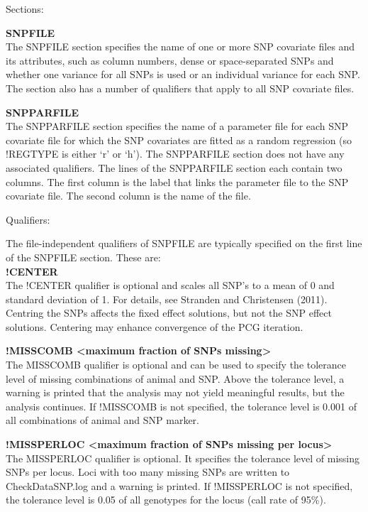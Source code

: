 Sections:

\textbf{SNPFILE}\\
The SNPFILE section specifies the name of one or more SNP covariate
files and its attributes, such as column numbers, dense or
space-separated SNPs and whether one variance for all SNPs is used or an
individual variance for each SNP. The section also has a number of
qualifiers that apply to all SNP covariate files.

\textbf{SNPPARFILE}\\
The SNPPARFILE section specifies the name of a parameter file for each
SNP covariate file for which the SNP covariates are fitted as a random
regression (so !REGTYPE is either `r' or `h'). The SNPPARFILE section
does not have any associated qualifiers. The lines of the SNPPARFILE
section each contain two columns. The first column is the label that
links the parameter file to the SNP covariate file. The second column is
the name of the file.

Qualifiers:

The file-independent qualifiers of SNPFILE are typically specified on
the first line of the SNPFILE section. These are:\\
\textbf{!CENTER}\\
The !CENTER qualifier is optional and scales all SNP's to a mean of 0
and standard deviation of 1. For details, see Stranden and Christensen
(2011). Centring the SNPs affects the fixed effect solutions, but not
the SNP effect solutions. Centering may enhance convergence of the PCG
iteration.

\textbf{!MISSCOMB \textless maximum fraction of SNPs
missing\textgreater{}}\\
The MISSCOMB qualifier is optional and can be used to specify the
tolerance level of missing combinations of animal and SNP. Above the
tolerance level, a warning is printed that the analysis may not yield
meaningful results, but the analysis continues. If !MISSCOMB is not
specified, the tolerance level is 0.001 of all combinations of animal
and SNP marker.

\textbf{!MISSPERLOC \textless maximum fraction of SNPs missing per
locus\textgreater{}}\\
The MISSPERLOC qualifier is optional. It specifies the tolerance level
of missing SNPs per locus. Loci with too many missing SNPs are written
to CheckDataSNP.log and a warning is printed. If !MISSPERLOC is not
specified, the tolerance level is 0.05 of all genotypes for the locus
(call rate of 95\%).

